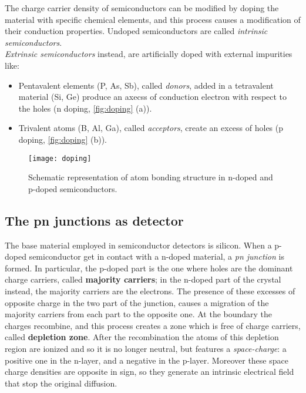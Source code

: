 The charge carrier density of semiconductors can be modified by doping the material with specific chemical elements, and this process causes a modification of their conduction properties.
Undoped semiconductors are called \emph{intrinsic semiconductors}. \\
\emph{Extrinsic semiconductors} instead, are artificially doped with external impurities like: 

\begin{itemize}
\item Pentavalent elements (P, As, Sb), called \emph{donors}, added in a tetravalent material (Si, Ge) produce an axecss of conduction electron with respect to the holes (n doping, \autoref{fig:doping} (a)).
\item Trivalent atoms (B, Al, Ga), called \emph{acceptors}, create an excess of holes (p doping, \autoref{fig:doping} (b)).
\end{itemize}

\begin{figure}[h!]
\centering
\texttt{[image: doping]}
\caption{Schematic representation of atom bonding structure in n-doped and p-doped semiconductors.}
\label{fig:doping}
\end{figure}




\subsection{The pn junctions as detector}

The base material employed in semiconductor detectors is silicon. When a p-doped semiconductor get in contact with a n-doped material, a \textit{pn junction} is formed. In particular, the p-doped part is the one where holes are the dominant charge carriers, called \textbf{majority carriers}; in the n-doped part of the crystal instead, the majority carriers are the electrons. 
The presence of these excesses of opposite charge in the two part of the junction, causes a migration of the majority carriers from each part to the opposite one. At the boundary the charges recombine, and this process creates a zone which is free of charge carriers, called \textbf{depletion zone}. After the recombination the atoms of this depletion region are ionized and so it is no longer neutral, but features a \emph{space-charge}: a positive one in the n-layer, and a negative in the p-layer. Moreover these space charge densities are opposite in sign, so they generate an intrinsic electrical field that stop the original diffusion.\\

